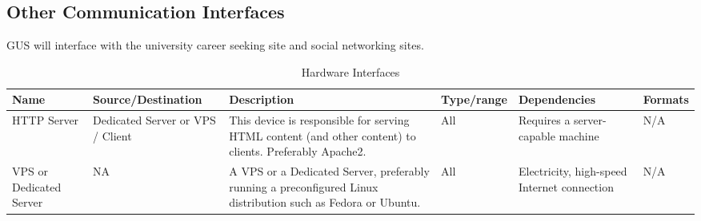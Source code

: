 		\subsection{Other Communication Interfaces}
			 GUS will interface with the university career seeking site
			 and social networking sites.
			 \pagebreak
			 \begin{landscape}
		\begin{table} \caption{Hardware Interfaces}
		\begin{tabular}{|p{1.75cm}|p{4cm}|p{5.25cm}|p{2.5cm}|p{3cm}|p{1.75cm}|} \hline
			 \textbf{Name}
			 & \textbf{Source/Destination}
			 & \textbf{Description}
			 & \textbf{Type/range}
			 & \textbf{Dependencies}
			 & \textbf{Formats}
			 \\\hline
			 HTTP Server
			 & Dedicated Server or VPS / Client
			 & This device is responsible for serving HTML content (and
			   other content) to clients. Preferably Apache2.
			 & All
			 & Requires a server-capable machine
			 & N/A
			 \\\hline
			 VPS or Dedicated Server
			 & NA
			 & A VPS or a Dedicated Server, preferably running a
			   preconfigured Linux distribution such as Fedora or Ubuntu.
			 & All
			 & Electricity, high-speed Internet connection
			 & N/A
			 \\\hline


\end{tabular}
\end{table}
\end{landscape}
